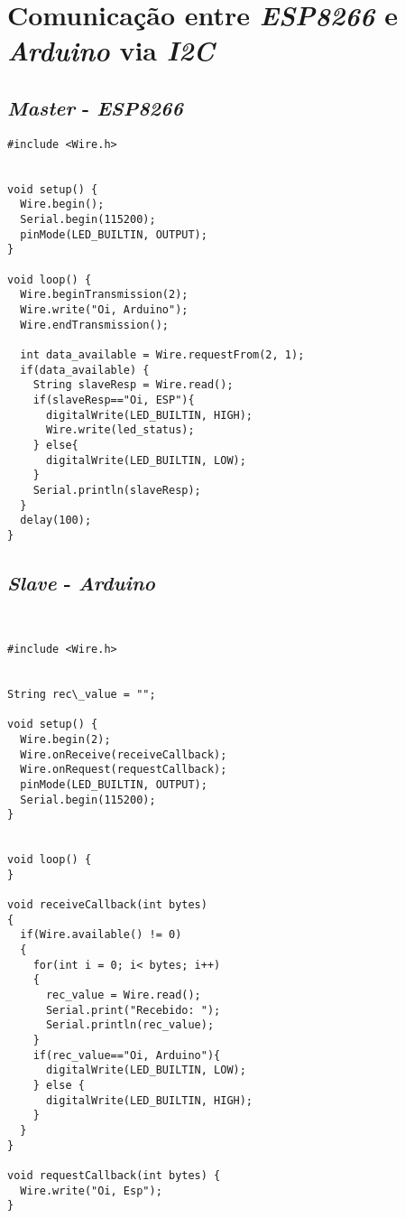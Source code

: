 \documentclass[
	11pt,				%
	openright,			%
	twoside,			%
	a5paper,			%
	english,			%
	french,				%
	spanish,			%
	brazil,				%
	sumario=tradicional
]{abntex2}
\begin{document}
\section{Comunicação entre \textit{ESP8266} e \textit{Arduino} via \textit{I2C}}

\subsection{\textit{Master} - \textit{ESP8266}}

\begin{lstlisting}
#include <Wire.h>
 
 
void setup() {
  Wire.begin();
  Serial.begin(115200);
  pinMode(LED_BUILTIN, OUTPUT);
}
 
void loop() {
  Wire.beginTransmission(2);
  Wire.write("Oi, Arduino");
  Wire.endTransmission();
 
  int data_available = Wire.requestFrom(2, 1);
  if(data_available) {
    String slaveResp = Wire.read();
    if(slaveResp=="Oi, ESP"){
      digitalWrite(LED_BUILTIN, HIGH);
      Wire.write(led_status);
    } else{
      digitalWrite(LED_BUILTIN, LOW);
    }
    Serial.println(slaveResp);
  } 
  delay(100);
}

\end{lstlisting}

\newpage

\subsection{\textit{Slave} - \textit{Arduino}}

\begin{lstlisting}


#include <Wire.h>
 

String rec\_value = "";
 
void setup() {
  Wire.begin(2);
  Wire.onReceive(receiveCallback);
  Wire.onRequest(requestCallback);
  pinMode(LED_BUILTIN, OUTPUT);
  Serial.begin(115200);
}
 
 
void loop() {
}
 
void receiveCallback(int bytes)
{
  if(Wire.available() != 0)
  {
    for(int i = 0; i< bytes; i++)
    {
      rec_value = Wire.read();
      Serial.print("Recebido: ");
      Serial.println(rec_value);
    }
    if(rec_value=="Oi, Arduino"){
      digitalWrite(LED_BUILTIN, LOW);
    } else {
      digitalWrite(LED_BUILTIN, HIGH);
    }
  }
}
 
void requestCallback(int bytes) {
  Wire.write("Oi, Esp");
}

\end{lstlisting}
\newpage
\end{document}
